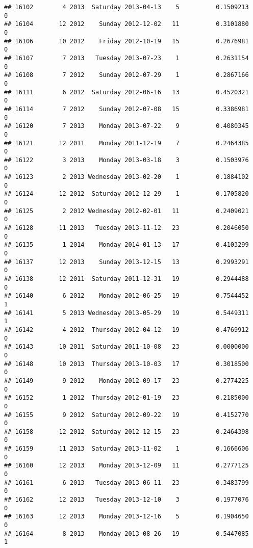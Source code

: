 \documentclass[
]{article}
\begin{document}
\begin{verbatim}
## 16102        4 2013  Saturday 2013-04-13    5          0.1509213             0
## 16104       12 2012    Sunday 2012-12-02   11          0.3101880             0
## 16106       10 2012    Friday 2012-10-19   15          0.2676981             0
## 16107        7 2013   Tuesday 2013-07-23    1          0.2631154             0
## 16108        7 2012    Sunday 2012-07-29    1          0.2867166             0
## 16111        6 2012  Saturday 2012-06-16   13          0.4520321             0
## 16114        7 2012    Sunday 2012-07-08   15          0.3386981             0
## 16120        7 2013    Monday 2013-07-22    9          0.4080345             0
## 16121       12 2011    Monday 2011-12-19    7          0.2464385             0
## 16122        3 2013    Monday 2013-03-18    3          0.1503976             0
## 16123        2 2013 Wednesday 2013-02-20    1          0.1884102             0
## 16124       12 2012  Saturday 2012-12-29    1          0.1705820             0
## 16125        2 2012 Wednesday 2012-02-01   11          0.2409021             0
## 16128       11 2013   Tuesday 2013-11-12   23          0.2046050             0
## 16135        1 2014    Monday 2014-01-13   17          0.4103299             0
## 16137       12 2013    Sunday 2013-12-15   13          0.2993291             0
## 16138       12 2011  Saturday 2011-12-31   19          0.2944488             0
## 16140        6 2012    Monday 2012-06-25   19          0.7544452             1
## 16141        5 2013 Wednesday 2013-05-29   19          0.5449311             1
## 16142        4 2012  Thursday 2012-04-12   19          0.4769912             0
## 16143       10 2011  Saturday 2011-10-08   23          0.0000000             0
## 16148       10 2013  Thursday 2013-10-03   17          0.3018500             0
## 16149        9 2012    Monday 2012-09-17   23          0.2774225             0
## 16152        1 2012  Thursday 2012-01-19   23          0.2185000             0
## 16155        9 2012  Saturday 2012-09-22   19          0.4152770             0
## 16158       12 2012  Saturday 2012-12-15   23          0.2464398             0
## 16159       11 2013  Saturday 2013-11-02    1          0.1666606             0
## 16160       12 2013    Monday 2013-12-09   11          0.2777125             0
## 16161        6 2013   Tuesday 2013-06-11   23          0.3483799             0
## 16162       12 2013   Tuesday 2013-12-10    3          0.1977076             0
## 16163       12 2013    Monday 2013-12-16    5          0.1904650             0
## 16164        8 2013    Monday 2013-08-26   19          0.5447085             1

\end{verbatim}
\end{document}
